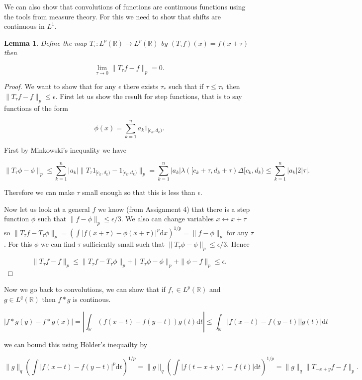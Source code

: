 \documentclass[
]{book}
\newtheorem{lemma}{Lemma}[chapter]
\theoremstyle{definition}
\theoremstyle{definition}
\theoremstyle{definition}
\theoremstyle{definition}
\theoremstyle{remark}
\begin{document}
We can also show that convolutions of functions are continuous functions using the tools from measure theory. For this we need to show that shifts are continuous in \(L^1\).

\begin{lemma}
Define the map \(T_\tau: L^p(\mathbb{R}) \rightarrow L^p(\mathbb{R})\) by \((T_\tau f)(x) = f(x+ \tau)\) then

\[ \lim_{\tau \rightarrow 0}\|T_\tau f - f\|_p = 0. \]
\end{lemma}

\begin{proof}
We want to show that for any \(\epsilon\) there exists \(\tau_*\) such that if \(\tau \leq \tau_*\) then \(\|T_\tau f-f\|_p \leq \epsilon\). First let us show the result for step functions, that is to say functions of the form

\[ \phi(x) = \sum_{k=1}^n a_k 1_{[c_k, d_k)}.\]

First by Minkowski's inequality we have

\[ \| T_\tau \phi - \phi\|_p \leq \sum_{k=1}^n |a_k| \| T_\tau 1_{[c_k, d_k)} - 1_{[c_k, d_k)}\|_p  = \sum_{k=1}^n |a_k| \lambda ([c_k + \tau, d_k + \tau) \Delta [c_k, d_k) \leq \sum_{k=1}^n |a_k| 2|\tau|.\]

Therefore we can make \(\tau\) small enough so that this is less than \(\epsilon\).

Now let us look at a general \(f\) we know (from Assignment 4) that there is a step function \(\phi\) such that \(\|f-\phi\|_p \leq \epsilon/3\). We also can change variables \(x \leftrightarrow x+\tau\) so \(\|T_\tau f - T_\tau \phi\|_p = \left( \int |f(x+\tau) - \phi(x+\tau)|^p \mathrm{d}x\right)^{1/p} = \|f-\phi\|_p\) for any \(\tau\). For this \(\phi\) we can find \(\tau\) sufficiently small such that \(\|T_\tau \phi - \phi\|_p \leq \epsilon/3\). Hence

\[ \|T_\tau f - f\|_p  \leq \|T_\tau f - T_\tau \phi\|_p + \| T_\tau \phi - \phi\|_p + \| \phi - f\|_p \leq \epsilon. \]
\end{proof}

Now we go back to convolutions, we can show that if \(f, \in L^p(\mathbb{R})\) and \(g \in L^q(\mathbb{R})\) then \(f*g\) is continous.

\[ |f*g(y) - f*g(x)| = |\int_{\mathbb{R}}(f(x-t) - f(y-t)) g(t) \mathrm{d}t| \leq \int_\mathbb{R} |f(x-t)-f(y-t)||g(t)| \mathrm{d}t  \]

we can bound this using Hölder's inequailty by

\[ \|g\|_q \left(\int |f(x-t) - f(y-t)|^p\mathrm{d}t\right)^{1/p} = \|g\|_q \left(\int |f(t-x+y) - f(t)| \mathrm{d}t\right)^{1/p} = \|g\|_q \| T_{-x+y} f - f\|_p. \]
\end{document}
